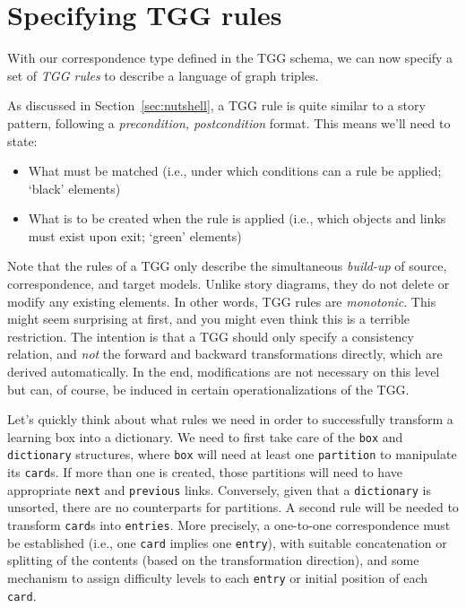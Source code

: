 \newpage
\hypertarget{sec:Rules}{}
\section{Specifying TGG rules}
\genHeader

With our correspondence type defined in the TGG schema, we can now specify a set of \emph{TGG rules} to describe a language of graph
triples.

As discussed in Section~\ref{sec:nutshell}, a TGG rule is quite similar to a story pattern, following a \emph{precondition, postcondition}
format. This means we'll need to state:

\begin{itemize}

\item What must be matched (i.e., under which conditions can a rule be applied; `black' elements)

\item What is to be created when the rule is applied (i.e., which objects and links must exist upon exit; `green' elements)

\end{itemize}

\vspace{0.5cm}

Note that the rules of a TGG only describe the simultaneous \emph{build-up} of source, correspondence, and target models.
Unlike story diagrams, they do not delete or modify any existing elements. 
In other words, TGG rules are \emph{monotonic}.
This might seem surprising at first, and you might even think this is a terrible restriction. 
The intention is that a TGG should only specify a consistency relation, and \emph{not} the forward and backward transformations
directly, which are derived automatically. 
In the end, modifications are not necessary on this level but can, of course, be induced in certain operationalizations of the TGG.

Let's quickly think about what rules we need in order to successfully transform a learning box into a dictionary. 
We need to first take care of the \texttt{box}
and \texttt{dictionary} structures, where \texttt{box} will need at least one \texttt{partition} to manipulate its \texttt{card}s. If more than one is created, those partitions will need to have appropriate \texttt{next} and \texttt{previous} links. 
Conversely, given that a \texttt{dictionary} is unsorted, there are no
counterparts for partitions. 
A second rule will be needed to transform \texttt{card}s into \texttt{entries}.
More precisely, a one-to-one correspondence must be
established (i.e., one \texttt{card} implies one \texttt{entry}), with suitable
concatenation or splitting of the contents (based on the transformation direction), and some mechanism to assign difficulty levels to each \texttt{entry} or initial position of each \texttt{card}.







